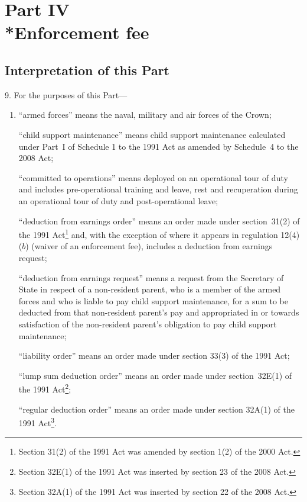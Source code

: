 \documentclass[12pt,a4paper]{article}
\begin{document}
\section[Part IV --- Enforcement fee]{Part IV\\*Enforcement fee}

\renewcommand\parthead{--- Part IV}

\subsection[9. Interpretation of this Part]{Interpretation of this Part}

9.  For the purposes of this Part—
\begin{enumerate}\item[]
“armed forces” means the naval, military and air forces of the Crown;

“child support maintenance” means child support maintenance calculated under Part~I of Schedule 1 to the 1991 Act as amended by Schedule~4 to the 2008 Act;

“committed to operations” means deployed on an operational tour of duty and includes pre-operational training and leave, rest and recuperation during an operational tour of duty and post-operational leave;

“deduction from earnings order” means an order made under section~31(2) of the 1991 Act\footnote{Section 31(2) of the 1991 Act was amended by section 1(2) of the 2000 Act.} and, with the exception of where it appears in regulation 12(4)($b$)  (waiver of an enforcement fee), includes a deduction from earnings request;

“deduction from earnings request” means a request from the Secretary of State in respect of a non-resident parent, who is a member of the armed forces and who is liable to pay child support maintenance, for a sum to be deducted from that non-resident parent’s pay and appropriated in or towards satisfaction of the non-resident parent’s obligation to pay child support maintenance;

“liability order” means an order made under section 33(3) of the 1991 Act;

“lump sum deduction order” means an order made under section~32E(1) of the 1991 Act\footnote{Section 32E(1) of the 1991 Act was inserted by section 23 of the 2008 Act.};

“regular deduction order” means an order made under section 32A(1) of the 1991 Act\footnote{Section 32A(1) of the 1991 Act was inserted by section 22 of the 2008 Act.}.
\end{enumerate}
\end{document}
